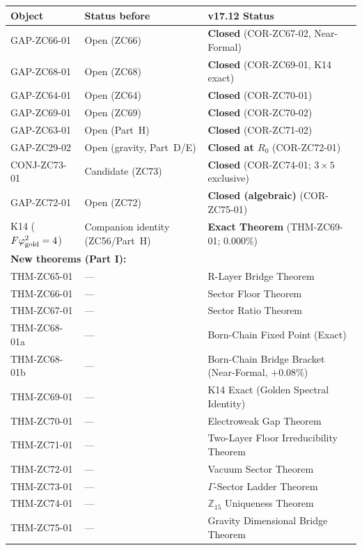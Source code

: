 \documentclass[12pt, a4paper]{article}
\begin{document}
\begin{keybox}[title={Status changes across the ZC64--75 arc}]
\begin{longtable}{@{}p{3.6cm}p{3.6cm}p{6.4cm}@{}}
\toprule
\textbf{Object} & \textbf{Status before} & \textbf{v17.12 Status}\\
\midrule
\endhead
GAP-ZC66-01 & Open (ZC66) & \textbf{Closed} (COR-ZC67-02, Near-Formal)\\
GAP-ZC68-01 & Open (ZC68) & \textbf{Closed} (COR-ZC69-01, K14 exact)\\
GAP-ZC64-01 & Open (ZC64) & \textbf{Closed} (COR-ZC70-01)\\
GAP-ZC69-01 & Open (ZC69) & \textbf{Closed} (COR-ZC70-02)\\
GAP-ZC63-01 & Open (Part~H) & \textbf{Closed} (COR-ZC71-02)\\
GAP-ZC29-02 & Open (gravity, Part~D/E) & \textbf{Closed at $R_0$} (COR-ZC72-01)\\
CONJ-ZC73-01 & Candidate (ZC73) & \textbf{Closed} (COR-ZC74-01; $3\times5$ exclusive)\\
GAP-ZC72-01 & Open (ZC72) & \textbf{Closed (algebraic)} (COR-ZC75-01)\\
\midrule
K14 ($F\varphi_{\rm gold}^{2}=4$) & Companion identity (ZC56/Part~H) &
  \textbf{Exact Theorem} (THM-ZC69-01; $0.000\%$)\\
\midrule
\multicolumn{3}{l}{\textbf{New theorems (Part I):}}\\
THM-ZC65-01 & --- & R-Layer Bridge Theorem\\
THM-ZC66-01 & --- & Sector Floor Theorem\\
THM-ZC67-01 & --- & Sector Ratio Theorem\\
THM-ZC68-01a & --- & Born-Chain Fixed Point (Exact)\\
THM-ZC68-01b & --- & Born-Chain Bridge Bracket (Near-Formal, $+0.08\%$)\\
THM-ZC69-01 & --- & K14 Exact (Golden Spectral Identity)\\
THM-ZC70-01 & --- & Electroweak Gap Theorem\\
THM-ZC71-01 & --- & Two-Layer Floor Irreducibility Theorem\\
THM-ZC72-01 & --- & Vacuum Sector Theorem\\
THM-ZC73-01 & --- & $\Gamma$-Sector Ladder Theorem\\
THM-ZC74-01 & --- & $\mathbb{Z}_{15}$ Uniqueness Theorem\\
THM-ZC75-01 & --- & Gravity Dimensional Bridge Theorem\\

\end{longtable}
\end{keybox}
\end{document}
